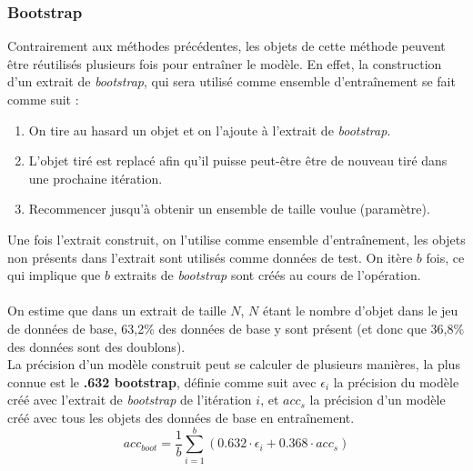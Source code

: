 \documentclass[letterpaper, 12pt]{article}
\newcommand{\alinea}{
\hspace*{0.5cm}}
\begin{document}
			\subsubsection{Bootstrap}
				\alinea Contrairement aux méthodes précédentes, les
					objets de cette méthode peuvent être réutilisés
					plusieurs fois pour entraîner le modèle. En effet, 
					la construction d'un extrait de \textit{bootstrap},
					qui sera utilisé comme ensemble d'entraînement se fait
					comme suit :
					\begin{enumerate}
						\setlength{\itemsep}{0pt}
						\setlength{\parskip}{0pt}
						\setlength{\parsep}{0pt}
						\item On tire au hasard un objet et on l'ajoute
							à l'extrait de \textit{bootstrap}.
						\item L'objet tiré est replacé afin qu'il puisse
							peut-être être de nouveau tiré dans une 
							prochaine itération.
						\item Recommencer jusqu'à obtenir un ensemble
							de taille voulue (paramètre).
					\end{enumerate}
					Une fois l'extrait construit, on l'utilise
					comme ensemble d'entraînement, les objets non présents
					dans l'extrait sont utilisés comme données
					de test. On itère $b$ fois, ce qui implique que $b$
					extraits de \textit{bootstrap} sont créés au cours de
					l'opération.\\
				~\\
				\alinea On estime que dans un extrait de taille $N$,
					$N$ étant le nombre d'objet dans le jeu de données de base,
					63,2\% des données de base y sont présent (et donc que
					36,8\% des données sont des doublons).\\
				\alinea La précision d'un modèle construit peut se calculer 
					de plusieurs manières, la plus connue est le
					\textbf{.632 bootstrap}, définie comme suit avec
					$\epsilon_i$ la précision du modèle créé avec 
					l'extrait de \textit{bootstrap} de 
					l'itération $i$, et $acc_s$ la précision d'un modèle
					créé avec tous les objets des données de base en
					entraînement.
					$$ acc_{boot} = \frac{1}{b} \sum_{i=1}^{b}(0.632 
			   					    \cdot \epsilon_i + 0.368 \cdot acc_s) $$
\end{document}
